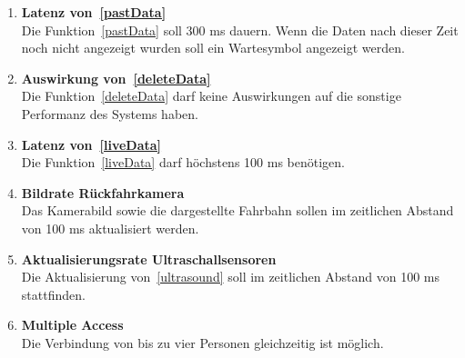 \documentclass[pflichtenheft.tex]{subfiles}
\begin{document}
\begin{enumerate}

	\item{\textbf{Latenz von~\ref{pastData}}} \\
	Die Funktion~\ref{pastData} soll 300 ms dauern. Wenn die Daten nach dieser Zeit noch nicht angezeigt wurden soll ein Wartesymbol angezeigt werden. 

	\item{\textbf{Auswirkung von~\ref{deleteData}}} \\
	Die Funktion~\ref{deleteData} darf keine Auswirkungen auf die sonstige Performanz des Systems haben.

	\item{\textbf{Latenz von~\ref{liveData}}} \\
	Die Funktion~\ref{liveData} darf höchstens 100 ms benötigen.

	\item{\textbf{Bildrate Rückfahrkamera}} \\
	Das Kamerabild sowie die dargestellte Fahrbahn sollen im zeitlichen Abstand von 100 ms aktualisiert werden.

	\item{\textbf{Aktualisierungsrate Ultraschallsensoren}} \\
	Die Aktualisierung von~\ref{ultrasound} soll im zeitlichen Abstand von 100 ms stattfinden.

	\item{\textbf{Multiple Access}} \\
	Die Verbindung von bis zu vier Personen gleichzeitig ist möglich.


\end{enumerate}
\end{document}
